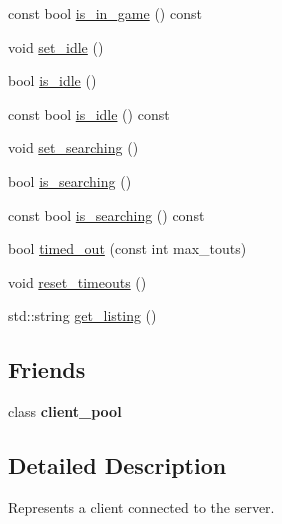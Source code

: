 \begin{DoxyCompactItemize}
\item 
const bool \hyperlink{classbattleship_1_1game__server_1_1client_a3d2b688869f4470381cd47f09d8a6239}{is\+\_\+in\+\_\+game} () const
\item 
void \hyperlink{classbattleship_1_1game__server_1_1client_a106984508ae941fa5a88dbe066214ad4}{set\+\_\+idle} ()
\item 
bool \hyperlink{classbattleship_1_1game__server_1_1client_a0f8168fdcc8e5ff4daa41eb208173a1a}{is\+\_\+idle} ()
\item 
const bool \hyperlink{classbattleship_1_1game__server_1_1client_a996d6df89391d08aa4b02d7a2ae77322}{is\+\_\+idle} () const
\item 
void \hyperlink{classbattleship_1_1game__server_1_1client_abee4c579c35854d0a79a1f0dbc712006}{set\+\_\+searching} ()
\item 
bool \hyperlink{classbattleship_1_1game__server_1_1client_a0a95758fec7cd830ca19278a2b619e92}{is\+\_\+searching} ()
\item 
const bool \hyperlink{classbattleship_1_1game__server_1_1client_a6438e71d667d166f663d8d7e67ff7d38}{is\+\_\+searching} () const
\item 
bool \hyperlink{classbattleship_1_1game__server_1_1client_a3975d4198aa55bdf690e2268b3f76080}{timed\+\_\+out} (const int max\+\_\+touts)
\item 
void \hyperlink{classbattleship_1_1game__server_1_1client_a8f594fcecac15941f7fee46a0340bfe4}{reset\+\_\+timeouts} ()
\item 
std\+::string \hyperlink{classbattleship_1_1game__server_1_1client_a828c6732dc5e35bd2cfd1f73d69a54a9}{get\+\_\+listing} ()
\end{DoxyCompactItemize}
\subsection*{Friends}
\begin{DoxyCompactItemize}
\item 
\mbox{\label{classbattleship_1_1game__server_1_1client_ab170f98a853909cd44b3f981a3c3aff5}} 
class {\bfseries client\+\_\+pool}
\end{DoxyCompactItemize}


\subsection{Detailed Description}
Represents a client connected to the server. 

